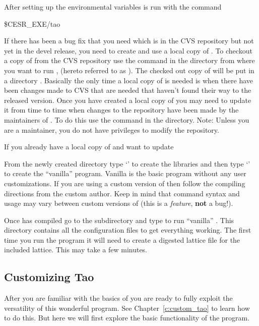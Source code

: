 After setting up the environmental variables \tao is run with the command
\begin{example}
  \$CESR_EXE/tao
\end{example}
If there has been a bug fix that you need which is in the CVS
repository but not yet in the devel release, you need to create and
use a local copy of \tao. To checkout a copy of \tao from the CVS
repository use the command  in the directory
from where you want to run \tao, (hereto referred to as
). The checked out copy of \tao will be put in a directory
. Basically the only time a local copy of \tao is needed
is when there have been changes made to CVS that are needed that
haven't found their way to the released version. Once you have created
a local copy of \tao you may need to update it from time to time when
changes to the repository have been made by the maintainers of
\tao. To do this use the command  in the
 directory. Note: Unless you are a maintainer, you do not
have privileges to modify the repository.



If you already have a
local copy of \tao and want to update

From the newly created  directory type `' to
create the libraries and then type `' to create
the ``vanilla'' \tao program. Vanilla \tao is the basic \tao program
without any user customizations. If you are using a custom version of
\tao then follow the compiling directions from the custom \tao
author. Keep in mind that command syntax and usage may vary between
custom versions of \tao (this is a \textit{feature}, \textbf{not} a
bug!).

Once \tao has compiled go to the subdirectory 
and type  to run ``vanilla'' \tao. This directory
contains all the configuration files to get everything working. The
first time you run the program it will need to create a digested \bmad
lattice file for the included lattice. This may take a few minutes.

\subsection{Customizing Tao}

After you are familiar with the basics of \tao you are ready to fully
exploit the versatility of this wonderful program. See
Chapter~\ref{c:custom_tao} to learn how to do this. But here we will
first explore the basic functionality of the program.

